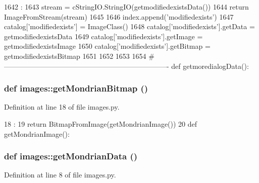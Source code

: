 \begin{DoxyCode}
1642                             :
1643     stream = cStringIO.StringIO(getmodifiedexistsData())
1644     return ImageFromStream(stream)
1645 
1646 index.append('modifiedexists')
1647 catalog['modifiedexists'] = ImageClass()
1648 catalog['modifiedexists'].getData = getmodifiedexistsData
1649 catalog['modifiedexists'].getImage = getmodifiedexistsImage
1650 catalog['modifiedexists'].getBitmap = getmodifiedexistsBitmap
1651 
1652 
1653 
1654 #----------------------------------------------------------------------
def getmoredialogData():
\end{DoxyCode}
\hypertarget{namespaceimages_adaf569a2665c7c3339e543a858ef2931}{
\subsubsection[{getMondrianBitmap}]{\setlength{\rightskip}{0pt plus 5cm}def images::getMondrianBitmap ()}}
\label{namespaceimages_adaf569a2665c7c3339e543a858ef2931}


Definition at line 18 of file images.py.


\begin{DoxyCode}
18                        :
19     return BitmapFromImage(getMondrianImage())
20 
def getMondrianImage():
\end{DoxyCode}
\hypertarget{namespaceimages_a17bd4e134e1bfe7cfe5fc51f3de2284b}{
\subsubsection[{getMondrianData}]{\setlength{\rightskip}{0pt plus 5cm}def images::getMondrianData ()}}
\label{namespaceimages_a17bd4e134e1bfe7cfe5fc51f3de2284b}


Definition at line 8 of file images.py.


